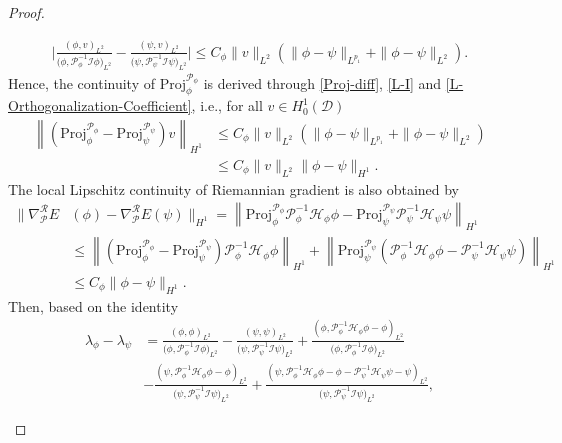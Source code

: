\documentclass[preprint,3p]{elsarticle}
\begin{document}
\begin{proof}
\begin{itemize}[label={},left=0pt]
		\begin{align}\label{L-Orthogonalization-Coefficient}
			\Bigg|\frac{(\phi,v)_{L^2}}{\big(\phi,\mathcal{P}_{\phi}^{-1}\mathcal{I}\phi\big)_{L^2}}-\frac{(\psi,v)_{L^2}}{\big(\psi,\mathcal{P}_{\psi}^{-1}\mathcal{I}\psi\big)_{L^2}}\Bigg|\le C_{\phi}\|v\|_{L^2}\left(\|\phi-\psi\|_{L^{p_1}}+\|\phi-\psi\|_{L^2}\right).
		\end{align}
		Hence, the continuity of $\text{Proj}^{\mathcal{P}_{\phi}}_{\phi}$ is derived through \eqref{Proj-diff}, \eqref{L-I} and \eqref{L-Orthogonalization-Coefficient}, i.e., for all $v\in H_0^1(\mathcal{D})$
		\begin{align}\label{L-Proj}
			\left\|\left(\text{Proj}^{\mathcal{P}_{\phi}}_{\phi}-\text{Proj}^{\mathcal{P}_{\psi}}_{\psi}\right)v\right\|_{H^1}&\le C_{\phi}\|v\|_{L^2}\left(\|\phi-\psi\|_{L^{p_1}}+\|\phi-\psi\|_{L^2}\right)\\
			\nonumber&\le C_{\phi}\|v\|_{L^2}\|\phi-\psi\|_{H^1}.
		\end{align}
		The local Lipschitz continuity of Riemannian gradient is also obtained by
		\begin{align*}
			\Big\|\nabla^{\mathcal{R}}_{\mathcal{P}} E&(\phi)-\nabla^{\mathcal{R}}_{\mathcal{P}}E(\psi)\Big\|_{H^1}=\left\|\text{Proj}^{\mathcal{P}_{\phi}}_{\phi}\mathcal{P}^{-1}_{\phi}\mathcal{H}_{\phi}\phi-\text{Proj}^{\mathcal{P}_{\psi}}_{\psi}\mathcal{P}^{-1}_{\psi}\mathcal{H}_{\psi}\psi\right\|_{H^1}\\
			&\le\left\|\left(\text{Proj}^{\mathcal{P}_{\phi}}_{\phi}-\text{Proj}^{\mathcal{P}_{\psi}}_{\psi}\right)\mathcal{P}^{-1}_{\phi}\mathcal{H}_{\phi}\phi\right\|_{H^1}+\left\|\text{Proj}^{\mathcal{P}_{\psi}}_{\psi}\left(\mathcal{P}^{-1}_{\phi}\mathcal{H}_{\phi}\phi-\mathcal{P}^{-1}_{\psi}\mathcal{H}_{\psi}\psi\right)\right\|_{H^1}\\
			&\le C_{\phi}\|\phi-\psi\|_{H^1}.
		\end{align*}
		Then, based on the identity
		\begin{align*}
			\lambda_{\phi}-\lambda_{\psi}&=\frac{(\phi,\phi)_{L^2}}{\big(\phi,\mathcal{P}_{\phi}^{-1}\mathcal{I}\phi\big)_{L^2}}-\frac{(\psi,\psi)_{L^2}}{\big(\psi,\mathcal{P}_{\psi}^{-1}\mathcal{I}\psi\big)_{L^2}}+\frac{(\phi,\mathcal{P}^{-1}_{\phi}\mathcal{H}_{\phi}\phi-\phi)_{L^2}}{\big(\phi,\mathcal{P}_{\phi}^{-1}\mathcal{I}\phi\big)_{L^2}}\\&-\frac{(\psi,\mathcal{P}^{-1}_{\phi}\mathcal{H}_{\phi}\phi-\phi)_{L^2}}{\big(\psi,\mathcal{P}_{\psi}^{-1}\mathcal{I}\psi\big)_{L^2}}+\frac{(\psi,\mathcal{P}^{-1}_{\phi}\mathcal{H}_{\phi}\phi-\phi-\mathcal{P}^{-1}_{\psi}\mathcal{H}_{\psi}\psi-\psi)_{L^2}}{\big(\psi,\mathcal{P}_{\psi}^{-1}\mathcal{I}\psi\big)_{L^2}},

\end{align*}
\end{itemize}
\end{proof}
\end{document}

